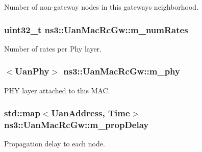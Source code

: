 Number of non-\/gateway nodes in this gateway\textquotesingle{}s neighborhood. 

\subsubsection[{\texorpdfstring{m\+\_\+num\+Rates}{m_numRates}}]{\setlength{\rightskip}{0pt plus 5cm}uint32\+\_\+t ns3\+::\+Uan\+Mac\+Rc\+Gw\+::m\+\_\+num\+Rates\hspace{0.3cm}{\ttfamily [private]}}\hypertarget{classns3_1_1UanMacRcGw_a86339396f55693d151f8c217bfcf6149}{}\label{classns3_1_1UanMacRcGw_a86339396f55693d151f8c217bfcf6149}


Number of rates per Phy layer. 

\subsubsection[{\texorpdfstring{m\+\_\+phy}{m_phy}}]{$<${\bf Uan\+Phy}$>$ ns3\+::\+Uan\+Mac\+Rc\+Gw\+::m\+\_\+phy\hspace{0.3cm}{\ttfamily [private]}}\hypertarget{classns3_1_1UanMacRcGw_a68b75b833bd901fb5b26b4ee92205866}{}\label{classns3_1_1UanMacRcGw_a68b75b833bd901fb5b26b4ee92205866}


P\+HY layer attached to this M\+AC. 

\subsubsection[{\texorpdfstring{m\+\_\+prop\+Delay}{m_propDelay}}]{\setlength{\rightskip}{0pt plus 5cm}std\+::map$<${\bf Uan\+Address}, {\bf Time}$>$ ns3\+::\+Uan\+Mac\+Rc\+Gw\+::m\+\_\+prop\+Delay\hspace{0.3cm}{\ttfamily [private]}}\hypertarget{classns3_1_1UanMacRcGw_adea1fcd9ce2850a32d2d7ff1f84c5958}{}\label{classns3_1_1UanMacRcGw_adea1fcd9ce2850a32d2d7ff1f84c5958}
Propagation delay to each node. 
